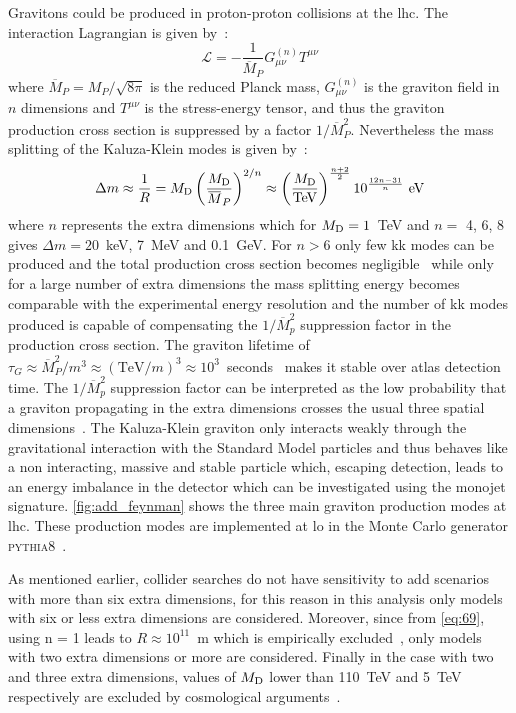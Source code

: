 Gravitons could be produced in proton-proton collisions at the \gls{lhc}. The
interaction Lagrangian is given by~\cite{ADDPhenomenology}:
\begin{equation}
  \label{eq:114}
  \mathcal{L} = - \frac{1}{\overbar{M}_P} G^{(n)}_{\mu\nu} T^{\mu\nu}
\end{equation}
where $\overbar{M}_P = M_P/\sqrt{8 \pi}$ is the reduced Planck mass,
$G^{(n)}_{\mu\nu}$ is the graviton field in $n$ dimensions and $T^{\mu\nu}$ is
the stress-energy tensor, and thus the graviton production cross section is
suppressed by a factor $1/\overbar{M}^2_P$. Nevertheless the mass splitting of
the Kaluza-Klein modes is given by~\cite{ADDPhenomenology}:
\begin{equation}
  \label{eq:115}
  \Delta m \approx \frac{1}{R} = \md \left( \frac{\md}{\overbar{M}_P}
  \right)^{2/n} \approx \left( \frac{\md}{\mathrm{TeV}} \right)^{\frac{n +
  2}{2}} 10^{\frac{12 n - 31}{n}}~\mathrm{eV}
\end{equation}
where $n$ represents the extra dimensions which for $M_\mathrm{D} = 1$~TeV and $n =$ 4,
6, 8 gives $\Delta m = 20$~keV, 7~MeV and 0.1~GeV. For $n > 6$ only few \gls{kk}
modes can be produced and the total production cross section becomes
negligible~\cite{ADDPhenomenology} while only for a large number of extra
dimensions the mass splitting energy becomes comparable with the experimental
energy resolution and the number of \gls{kk} modes produced is capable of
compensating the $1/\overbar{M}^2_p$ suppression factor in the production cross
section. The graviton lifetime of
$\tau_G \approx \overbar{M}^2_P/m^3 \approx (\mathrm{TeV}/m)^3 \approx
10^3$~seconds~\cite{ADDPhenomenology} makes it stable over \gls{atlas} detection
time. The $1/\overbar{M}^2_p$ suppression factor can be interpreted as the low
probability that a graviton propagating in the extra dimensions crosses the
usual three spatial dimensions~\cite{ADDPhenomenology}. The Kaluza-Klein
graviton only interacts weakly through the gravitational interaction with the
Standard Model particles and thus behaves like a non interacting, massive and
stable particle which, escaping detection, leads to an energy imbalance in the
detector which can be investigated using the monojet
signature. \cref{fig:add_feynman} shows the three main graviton production modes
at \gls{lhc}. These production modes are implemented at \gls{lo} in the Monte
Carlo generator \textsc{pythia8}~\cite{PYTHIA8}.

As mentioned earlier, collider searches do not have sensitivity to \gls{add}
scenarios with more than six extra dimensions, for this reason in this analysis
only models with six or less extra dimensions are considered. Moreover, since
from \cref{eq:69}, using n = 1 leads to $R \approx 10^{11}$~m which is
empirically excluded~\cite{ADDPhenomenology}, only models with two extra
dimensions or more are considered. Finally in the case with two and three extra
dimensions, values of $M_\mathrm{D}$ lower than 110~TeV and 5~TeV respectively are
excluded by cosmological arguments~\cite{ADDCosmology}.

